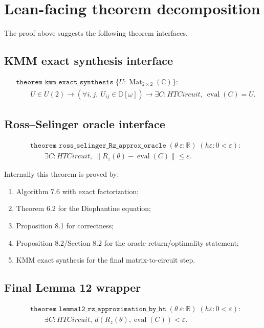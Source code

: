 \documentclass[11pt]{article}
\newcommand{\C}{\mathbb C}
\newcommand{\R}{\mathbb R}
\newcommand{\Dw}{\mathbb D[\omega]}
\newcommand{\eps}{\varepsilon}
\newcommand{\opnorm}[1]{\left\|#1\right\|}
\begin{document}
\section{Lean-facing theorem decomposition}

The proof above suggests the following theorem interfaces.

\subsection{KMM exact synthesis interface}

\[
\begin{aligned}
&\texttt{theorem kmm\_exact\_synthesis}\;\{U: \operatorname{Mat}_{2\times2}(\C)\}:\\
&\qquad U\in U(2)\to
   (\forall i,j,\ U_{ij}\in\Dw)\to
   \exists C:HTCircuit,\ \operatorname{eval}(C)=U.
\end{aligned}
\]

\subsection{Ross--Selinger oracle interface}

\[
\begin{aligned}
&\texttt{theorem ross\_selinger\_Rz\_approx\_oracle}\;(\theta\ \eps:\R)\;(h\eps:0<\eps):\\
&\qquad \exists C:HTCircuit,\
   \opnorm{R_z(\theta)-\operatorname{eval}(C)}\le \eps.
\end{aligned}
\]

Internally this theorem is proved by:
\begin{enumerate}
\item Algorithm 7.6 with exact factorization;
\item Theorem 6.2 for the Diophantine equation;
\item Proposition 8.1 for correctness;
\item Proposition 8.2/Section 8.2 for the oracle-return/optimality statement;
\item KMM exact synthesis for the final matrix-to-circuit step.
\end{enumerate}

\subsection{Final Lemma 12 wrapper}

\[
\begin{aligned}
&\texttt{theorem lemma12\_rz\_approximation\_by\_ht}\;(\theta\ \eps:\R)\;(h\eps:0<\eps):\\
&\qquad \exists C:HTCircuit,\ d(R_z(\theta),\operatorname{eval}(C))<\eps.
\end{aligned}
\]
\end{document}
